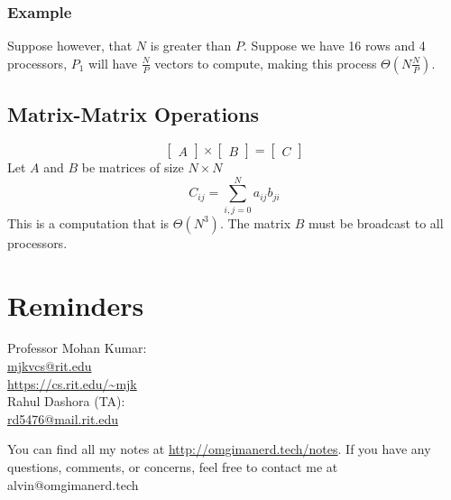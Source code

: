 \documentclass[letterpaper, 12pt]{math}
\begin{document}
\subsubsection*{Example}
Suppose however, that \( N \) is greater than \( P \). Suppose we have 16 rows
and 4 processors, \( P_1 \) will have \( \frac{N}{P} \) vectors to compute,
making this process \( \Theta(N\frac{N}{P}) \).

\subsection*{Matrix-Matrix Operations}
\[ \begin{bmatrix}A\end{bmatrix}\times
  \begin{bmatrix}B\end{bmatrix} = \begin{bmatrix}C\end{bmatrix} \]
Let \( A \) and \( B \) be matrices of size \( N\times N \)
\[ C_{ij} = \sum_{i,j=0}^{N}a_{ij}b_{ji} \]
This is a computation that is \( \Theta(N^3) \). The matrix \( B \) must be
broadcast to all processors.

\section*{Reminders}
Professor Mohan Kumar: \\
\url{mjkvcs@rit.edu} \\
\url{https://cs.rit.edu/~mjk} \\

\noindent Rahul Dashora (TA): \\
\url{rd5476@mail.rit.edu}

\begin{center}
  You can find all my notes at \url{http://omgimanerd.tech/notes}. If you have
  any questions, comments, or concerns, feel free to contact me at
  alvin@omgimanerd.tech
\end{center}
\end{document}
